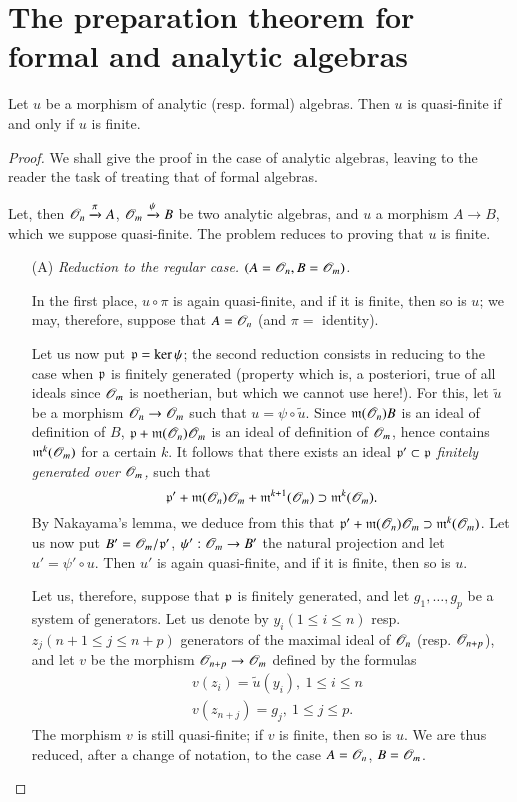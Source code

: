 \section{The preparation theorem for formal and analytic algebras}\label{chap3-sec3}

\begin{theorem}\label{chap3-thm3.1}
Let $u$ be a morphism of analytic (resp. formal) algebras. Then $u$ is quasi-finite if and only if $u$ is finite.
\end{theorem}

\begin{proof}
We shall give the proof in the case of analytic algebras, leaving to the reader the task of treating that of formal algebras.

Let, then $\mathscr{O}_{n}\xrightarrow{\pi}A$, $\mathscr{O}_{m}\xrightarrow{\psi}B$ be two analytic algebras, and $u$ a morphism $A\to B$, which we suppose quasi-finite. The problem reduces to proving that $u$ is finite.
\begin{itemize}
\item[(A)] {\em Reduction to the regular case. $(A=\mathscr{O}_{n},B=\mathscr{O}_{m})$.}

In the first place, $u\circ \pi$ is again quasi-finite, and if it is finite, then so is $u$; we may, therefore, suppose that $A=\mathscr{O}_{n}$ (and $\pi=$ identity).

Let us now put $\mathfrak{p}=\ker\psi$; the second reduction consists in reducing to the case when $\mathfrak{p}$ is finitely generated (property which is, a posteriori, true of all ideals since $\mathscr{O}_{m}$ is noetherian, but which we cannot use here!). For this, let $\widetilde{u}$ be a morphism $\mathscr{O}_{n}\to \mathscr{O}_{m}$ such that $u=\psi\circ \widetilde{u}$. Since $\mathfrak{m}(\mathscr{O}_{n})B$ is an ideal of definition of $B$, $\mathfrak{p}+\mathfrak{m}(\mathscr{O}_{n})\mathscr{O}_{m}$ is an ideal of definition of $\mathscr{O}_{m}$, hence contains $\mathfrak{m}^{k}(\mathscr{O}_{m})$ for a certain $k$. It follows that there exists an ideal $\mathfrak{p}'\subset \mathfrak{p}$ {\em finitely generated over $\mathscr{O}_{m}$,} such that
$$
\mathfrak{p}'+\mathfrak{m}(\mathscr{O}_{n})\mathscr{O}_{m}+\mathfrak{m}^{k+1}(\mathscr{O}_{m})\supset \mathfrak{m}^{k}(\mathscr{O}_{m}).
$$
By Nakayama's lemma, we deduce from this that $\mathfrak{p}'+\mathfrak{m}(\mathscr{O}_{n})\mathscr{O}_{m}\supset \mathfrak{m}^{k}(\mathscr{O}_{m})$. Let us now put $B'=\mathscr{O}_{m}/\mathfrak{p}'$, $\psi':\mathscr{O}_{m}\to B'$ the natural projection and let $u'=\psi'\circ u$. Then $u'$ is again quasi-finite, and if it is finite, then so is $u$.

Let us, therefore, suppose that $\mathfrak{p}$ is finitely generated, and let $g_{1},\ldots,g_{p}$ be a system of generators. Let us denote by $y_{i}(1\leq i\leq n)$ resp. $z_{j}(n+1\leq j\leq n+p)$ generators of the maximal ideal of $\mathscr{O}_{n}$ (resp. $\mathscr{O}_{n+p}$), and let $v$ be the morphism $\mathscr{O}_{n+p}\to \mathscr{O}_{m}$ defined by the formulas
\begin{align*}
& v(z_{i})=\widetilde{u}(y_{i}), \ 1\leq i\leq n\\
& v(z_{n+j})=g_{j}, \ 1\leq j\leq p.
\end{align*}
The morphism $v$ is still quasi-finite; if $v$ is finite, then so is $u$. We are thus reduced, after a change of notation, to the case $A=\mathscr{O}_{n}$, $B=\mathscr{O}_{m}$.


\end{itemize}
\end{proof}
